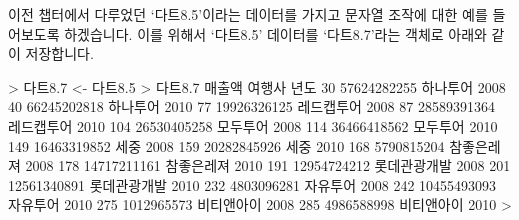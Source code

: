 \begin{comment}
	rm(list=ls())
	library(XLConnect)
	wb <- loadWorkbook("../dataset/dart8.xls")
	tmp <- readWorksheet(wb, sheet=getSheets(wb))
	mydata <- do.call(rbind, tmp)
	names(mydata)[1] <- c("년도별분기")
	mydata$여행사 <- do.call(rbind, strsplit(rownames(mydata), ".", fixed=TRUE))[,1]
	mydata$여행사 <- factor(mydata$여행사, levels=unique(mydata$여행사))
	mydata$번호 <- do.call(rbind, strsplit(rownames(mydata), ".", fixed=TRUE))[,2]
	rownames(mydata) <- NULL
	yrQ <- as.data.frame(do.call(rbind, strsplit(as.character(mydata$년도별분기), ".", fixed=TRUE)))
	names(yrQ) <- c("년도", "분기")
	mydata <- data.frame(mydata, yrQ)
	mydata <- mydata[,-1]
	mydata$분기 <- factor(mydata$분기, levels=c("03", "06", "09", "12"), labels=c("1분기", "2분기", "3분기", "4분기"))
	mydata$여행사 <- factor(mydata$여행사)
	mydatax <- na.exclude(mydata)

	다트8 <- subset(mydata, subset=(년도 %
	다트8.1 <- 다트8[order(다트8$년도),]
	다트8.1$first <- !duplicated(다트8.1$년도)
	다트8.1$last <- !duplicated(다트8.1$년도, fromLast=TRUE)

	다트8.2 <- 다트8.1[c(FALSE, FALSE, TRUE, TRUE, FALSE, TRUE, FALSE, FALSE, FALSE)]
	다트8.3 <- 다트8.2[order(다트8.2$여행사, 다트8.2$년도), ]
	다트8.3$first <- !duplicated(다트8.3$여행사)
	다트8.3$last <- !duplicated(다트8.3$여행사, fromLast=TRUE)
	다트8.4 <- subset(다트8.3, subset=(first == TRUE | last == TRUE))
	다트8.5 <- 다트8.4[,-c(4:5)]
	다트8.6 <- reshape(다트8.5, timevar="년도", idvar="여행사", direction="wide")
	다트8.6$차이 <- with(다트8.6, 매출액.2010 - 매출액.2008)
	reshape(다트8.6,  v.names=c("매출액"), varying=c("매출액.2008", "매출액.2010"), direction="long", timevar=c("년도"), times=c("2008", "2010"), ids=row.names(다트8.6))
\end{comment}

이전 챕터에서 다루었던 `다트8.5'이라는 데이터를 가지고 문자열 조작에 대한 예를 들어보도록 하겠습니다.
이를 위해서 `다트8.5' 데이터를 `다트8.7'라는 객체로 아래와 같이 저장합니다.
 
\begin{Schunk}
% 다트8.7 <- 다트8.5
\begin{Soutput}
> 다트8.7 <- 다트8.5
> 다트8.7
         매출액       여행사 년도
30  57624282255     하나투어 2008
40  66245202818     하나투어 2010
77  19926326125   레드캡투어 2008
87  28589391364   레드캡투어 2010
104 26530405258     모두투어 2008
114 36466418562     모두투어 2010
149 16463319852         세중 2008
159 20282845926         세중 2010
168  5790815204   참좋은레져 2008
178 14717211161   참좋은레져 2010
191 12954724212 롯데관광개발 2008
201 12561340891 롯데관광개발 2010
232  4803096281     자유투어 2008
242 10455493093     자유투어 2010
275  1012965573   비티앤아이 2008
285  4986588998   비티앤아이 2010
> 
\end{Soutput}
\end{Schunk}

